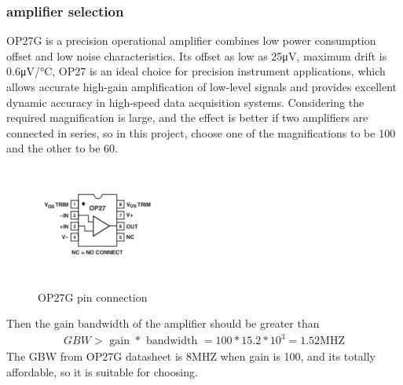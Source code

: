 \subsubsection{amplifier selection}
OP27G is a precision operational amplifier combines low power consumption offset and low noise characteristics. Its offset as low as 25μV, maximum drift is 0.6μV/°C, OP27 is an ideal choice for precision instrument applications, which allows accurate high-gain amplification of low-level signals and provides excellent dynamic accuracy in high-speed data acquisition systems.
Considering the required magnification is large, and the effect is better if two amplifiers are connected in series, so in this project, choose one of the magnifications to be 100 and the other to be 60.
\begin{figure}[H]
    \centering
    \includegraphics[width=4cm,height=4cm]{figure/OP27Gpin.PNG}
    \caption{OP27G pin connection}
\end{figure}
Then the gain bandwidth of the amplifier should be greater than
 \begin{align}
G B W>\text { gain } * \text { bandwidth }=100 * 15.2 * 10^{3}=1.52 \mathrm{MHZ}
\end{align}
The GBW from OP27G datasheet is 8MHZ when gain is 100, and its totally affordable, so it is suitable for choosing.
